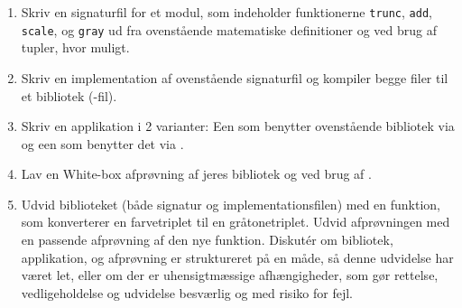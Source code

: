 \documentclass[a4paper,12pt]{article}
\begin{document}
\begin{enumerate}[label=4ø.\arabic*,start=0]
\item Skriv en signaturfil for et modul, som indeholder funktionerne \lstinline{trunc}, \lstinline{add}, \lstinline{scale}, og \lstinline{gray} ud fra ovenstående matematiske definitioner og ved brug af tupler, hvor muligt.
\item Skriv en implementation af ovenstående signaturfil og kompiler begge filer til et bibliotek (-fil).
\item Skriv en applikation i 2 varianter: Een som benytter ovenstående bibliotek via  og een som benytter det via .
\item Lav en White-box afprøvning af jeres bibliotek og ved brug af .
\item Udvid biblioteket (både signatur og implementationsfilen) med en funktion, som konverterer en farvetriplet til en gråtonetriplet. Udvid afprøvningen med en passende afprøvning af den nye funktion. Diskut\'{e}r om bibliotek, applikation, og afprøvning er struktureret på en måde, så denne udvidelse har været let, eller om der er uhensigtmæssige afhængigheder, som gør rettelse, vedligeholdelse og udvidelse besværlig og med risiko for fejl.
\end{enumerate}
\end{document}
